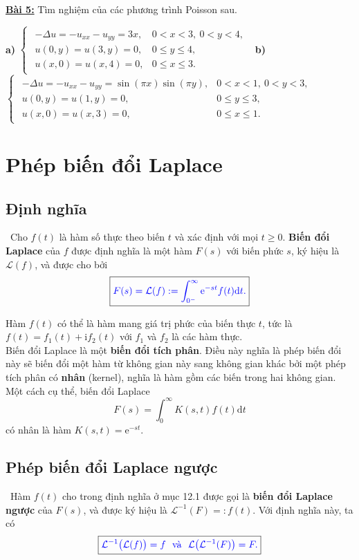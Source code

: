 \documentclass[10pt, a4paper]{article}
\begin{document}
	\textbf{\color{red}\underline{Bài 5:}} Tìm nghiệm của các phương trình Poisson sau.
	\begin{flushleft}
		\textbf{a) }$\begin{cases}
			\begin{array}{ll}
				-\Delta u=-u_{xx}-u_{yy}=3x, & 0<x<3,~0<y<4,\\
				u(0,y)=u(3,y)=0, & 0\le y\le4,\\
				u(x,0)=u(x,4)=0, & 0\le x\le3.
			\end{array}
		\end{cases}$\vskip7pt
		\textbf{b) }$\begin{cases}
			\begin{array}{ll}
				-\Delta u=-u_{xx}-u_{yy}=\sin(\pi x)\sin(\pi y), & 0<x<1,~0<y<3,\\
				u(0,y)=u(1,y)=0, & 0\le y\le3,\\
				u(x,0)=u(x,3)=0, & 0\le x\le1.
			\end{array}
		\end{cases}$
	\end{flushleft}
	\newpage
	\section{Phép biến đổi Laplace}
	\subsection{Định nghĩa}
	\quad\,\,\,Cho $f(t)$ là hàm số thực theo biến $t$ và xác định với mọi $t\ge0$. \textbf{\color{red}Biến đổi Laplace} của $f$ được định nghĩa là một hàm $F(s)$ với biến phức $s$, ký hiệu là $\mathcal L(f)$, và được cho bởi $$\boxed{\color{blue}F(s)=\mathcal L(f):=\displaystyle\int_{0^-}^\infty\mathrm e^{-st}f(t)\text{d}t.}$$
	
	Hàm $f(t)$ có thể là hàm mang giá trị phức của biến thực $t$, tức là $f(t)=f_1(t)+\mathrm if_2(t)$ với $f_1$ và $f_2$ là các hàm thực.\\
	
	Biến đổi Laplace là một \textbf{\color{red}biến đổi tích phân}. Điều này nghĩa là phép biến đổi này sẽ biến đổi một hàm từ không gian này sang không gian khác bởi một phép tích phân có \textbf{\color{red}nhân} (kernel), nghĩa là hàm gồm các biến trong hai không gian. Một cách cụ thể, biến đổi Laplace $$F(s)=\int_{0}^\infty K(s,t)f(t)\text{d}t$$
	có nhân là hàm $K(s,t)=\mathrm e^{-st}$.
	\subsection{Phép biến đổi Laplace ngược}
	\quad\,\,\,Hàm $f(t)$ cho trong định nghĩa ở mục 12.1 được gọi là \textbf{\color{red}biến đổi Laplace ngược} của $F(s)$, và được ký hiệu là $\mathcal L^{-1}(F)=:f(t)$. Với định nghĩa này, ta có $$\boxed{\color{blue}\mathcal L^{-1}\big(\mathcal L(f)\big)=f~~\text{và}~~\mathcal L\big(\mathcal L^{-1}(F)\big)=F.}$$
\end{document}
